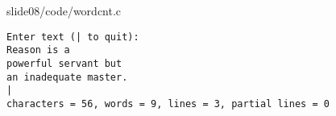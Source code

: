 \begin{frame}\ft{\secname}
  
  {slide08/code/wordcnt.c}
\end{frame}


\begin{frame}[fragile]\ft{\secname}
\begin{lstlisting}[backgroundcolor=\color{blue!20}]
Enter text (| to quit):
Reason is a 
powerful servant but
an inadequate master.
|
characters = 56, words = 9, lines = 3, partial lines = 0
\end{lstlisting}
\end{frame}

